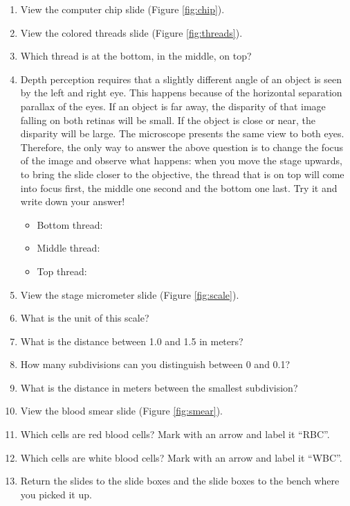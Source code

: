 \begin{enumerate}
\item
  View the computer chip slide (Figure \ref{fig:chip}).
\item
  View the colored threads slide (Figure \ref{fig:threads}).
\item
  Which thread is at the bottom, in the middle, on top?
\item
  Depth perception requires that a slightly different angle of an object
  is seen by the left and right eye. This happens because of the
  horizontal separation parallax of the eyes. If an object is far away,
  the disparity of that image falling on both retinas will be small. If
  the object is close or near, the disparity will be large. The
  microscope presents the same view to both eyes. Therefore, the only
  way to answer the above question is to change the focus of the image
  and observe what happens: when you move the stage upwards, to bring
  the slide closer to the objective, the thread that is on top will come
  into focus first, the middle one second and the bottom one last. Try
  it and write down your answer!

  \begin{itemize}
  \tightlist
  \item
    Bottom thread: \underline{\phantom{answer}}
  \item
    Middle thread: \underline{\phantom{answer}}
  \item
    Top thread: \underline{\phantom{answer}}
  \end{itemize}
\item
  View the stage micrometer slide (Figure \ref{fig:scale}).
\item
  What is the unit of this scale?
\item
  What is the distance between 1.0 and 1.5 in meters?
\item
  How many subdivisions can you distinguish between 0 and 0.1?
\item
  What is the distance in meters between the smallest subdivision?
\item
  View the blood smear slide (Figure \ref{fig:smear}).
\item
  Which cells are red blood cells? Mark with an arrow and label it
  ``RBC''.
\item
  Which cells are white blood cells? Mark with an arrow and label it
  ``WBC''.
\item
  Return the slides to the slide boxes and the slide boxes to the bench
  where you picked it up.
\end{enumerate}

